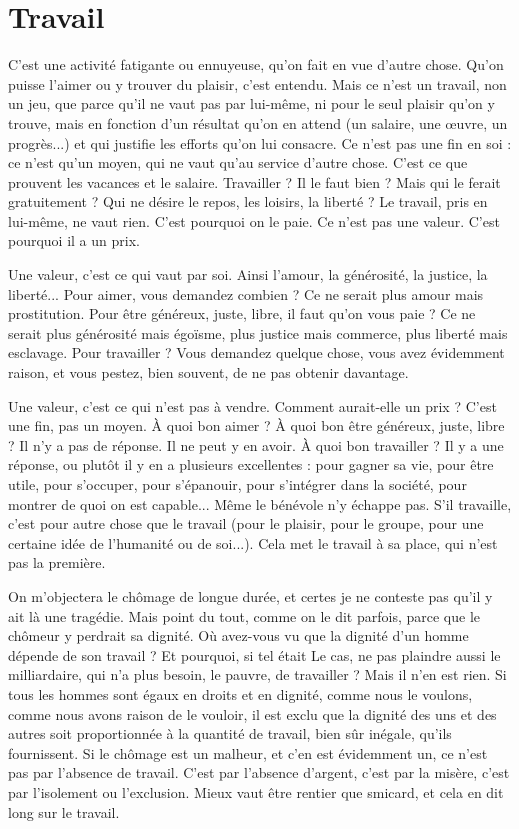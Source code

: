\section{Travail}
C’est une activité fatigante ou ennuyeuse, qu’on fait en vue d’autre
chose. Qu’on puisse l’aimer ou y trouver du plaisir, c’est entendu.
Mais ce n’est un travail, non un jeu, que parce qu’il ne vaut pas par lui-même,
ni pour le seul plaisir qu’on y trouve, mais en fonction d’un résultat qu’on en
attend (un salaire, une œuvre, un progrès...) et qui justifie les efforts qu’on lui
consacre. Ce n’est pas une fin en soi : ce n’est qu’un moyen, qui ne vaut qu’au
service d’autre chose. C’est ce que prouvent les vacances et le salaire.
Travailler ? Il le faut bien ? Mais qui le ferait gratuitement ? Qui ne désire le
repos, les loisirs, la liberté ? Le travail, pris en lui-même, ne vaut rien. C’est
pourquoi on le paie. Ce n’est pas une valeur. C’est pourquoi il a un prix.

Une valeur, c’est ce qui vaut par soi. Ainsi l’amour, la générosité, la justice,
la liberté... Pour aimer, vous demandez combien ? Ce ne serait plus amour
mais prostitution. Pour être généreux, juste, libre, il faut qu’on vous paie ? Ce
ne serait plus générosité mais égoïsme, plus justice mais commerce, plus liberté
mais esclavage. Pour travailler ? Vous demandez quelque chose, vous avez évidemment
raison, et vous pestez, bien souvent, de ne pas obtenir davantage.

Une valeur, c’est ce qui n’est pas à vendre. Comment aurait-elle un prix ?
C’est une fin, pas un moyen. À quoi bon aimer ? À quoi bon être généreux,
juste, libre ? Il n’y a pas de réponse. Il ne peut y en avoir. À quoi bon travailler ?
Il y a une réponse, ou plutôt il y en a plusieurs excellentes : pour gagner sa vie,
pour être utile, pour s'occuper, pour s’épanouir, pour s'intégrer dans la société,
pour montrer de quoi on est capable... Même le bénévole n’y échappe pas. S’il
travaille, c’est pour autre chose que le travail (pour le plaisir, pour le groupe,
pour une certaine idée de l'humanité ou de soi...). Cela met le travail à sa
place, qui n’est pas la première.

On m'objectera le chômage de longue durée, et certes je ne conteste pas
qu'il y ait là une tragédie. Mais point du tout, comme on le dit parfois, parce
que le chômeur y perdrait sa dignité. Où avez-vous vu que la dignité d’un
homme dépende de son travail ? Et pourquoi, si tel était Le cas, ne pas plaindre
aussi le milliardaire, qui n’a plus besoin, le pauvre, de travailler ? Mais il n’en
est rien. Si tous les hommes sont égaux en droits et en dignité, comme nous le
voulons, comme nous avons raison de le vouloir, il est exclu que la dignité des
uns et des autres soit proportionnée à la quantité de travail, bien sûr inégale,
qu’ils fournissent. Si le chômage est un malheur, et c’en est évidemment un, ce
n'est pas par l'absence de travail. C’est par l’absence d’argent, c’est par la
misère, c’est par l'isolement ou l'exclusion. Mieux vaut être rentier que smicard,
et cela en dit long sur le travail.

